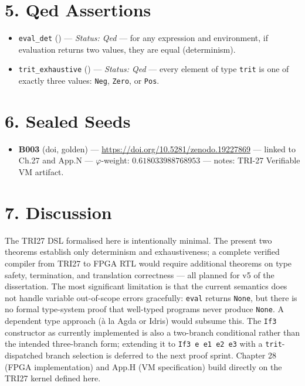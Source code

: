 \section{5. Qed
Assertions}\label{fa_27:qed-assertions}

\begin{itemize}
\tightlist
\item
  \texttt{eval\_det}
  ()
  --- \emph{Status: Qed} --- for any expression
  and environment, if evaluation returns two
  values, they are equal (determinism).
\item
  \texttt{trit\_exhaustive}
  ()
  --- \emph{Status: Qed} --- every element of type
  \texttt{trit} is one of exactly three values:
  \texttt{Neg}, \texttt{Zero}, or \texttt{Pos}.
\end{itemize}

\section{6. Sealed Seeds}\label{fa_27:sealed-seeds}

\begin{itemize}
\tightlist
\item
  \textbf{B003} (doi, golden) ---
  \url{https://doi.org/10.5281/zenodo.19227869}
  --- linked to Ch.27 and App.N ---
  \(\varphi\)-weight: \(0.618033988768953\) ---
  notes: TRI-27 Verifiable VM artifact.
\end{itemize}

\section{7. Discussion}\label{fa_27:discussion}

The TRI27 DSL formalised here is intentionally
minimal. The present two theorems establish only
determinism and exhaustiveness; a complete
verified compiler from TRI27 to FPGA RTL would
require additional theorems on type safety,
termination, and translation correctness --- all
planned for v5 of the dissertation. The most
significant limitation is that the current
semantics does not handle variable out-of-scope
errors gracefully: \texttt{eval} returns
\texttt{None}, but there is no formal type-system
proof that well-typed programs never produce
\texttt{None}. A dependent type approach (à la
Agda or Idris) would subsume this. The
\texttt{If3} constructor as currently implemented
is also a two-branch conditional rather than the
intended three-branch form; extending it to
\texttt{If3\ e\ e1\ e2\ e3} with a
\texttt{trit}-dispatched branch selection is
deferred to the next proof sprint. Chapter 28
(FPGA implementation) and App.H (VM specification)
build directly on the TRI27 kernel defined here.

